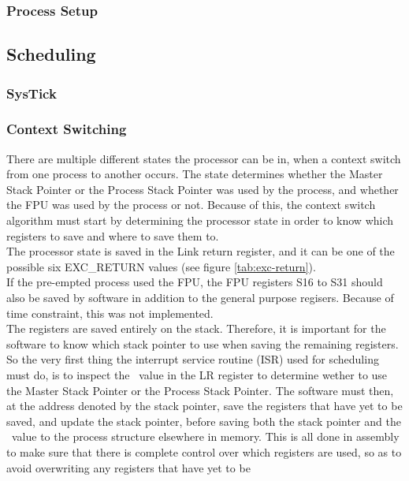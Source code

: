 \subsubsection{Process Setup}

\subsection{Scheduling}

\subsubsection{SysTick}

\subsubsection{Context Switching}
There are multiple different states the processor can be in, when a context 
switch from one process to another occurs. The state determines whether the
Master Stack Pointer or the Process Stack Pointer was used by the process,
and whether the FPU was used by the process or not. Because of this, the context
switch algorithm must start by determining the processor state in order to know
which registers
to save and where to save them to.\\
The processor state is saved in the Link return register, and it can be one of
the possible six EXC\_RETURN values (see figure \ref{tab:exc-return}).\\
If the pre-empted process used the FPU, the FPU registers S16 to S31
should also be saved by software in addition to the general purpose regisers.
Because of time constraint, this was not implemented.\\
The registers are saved entirely on the stack. Therefore, it is important for
the software to know which
stack pointer to use when saving the remaining registers. So the very first
thing the interrupt service routine (ISR) used for scheduling must do, is to inspect
the \excreturn\ value in the LR register to determine wether to use the 
Master Stack Pointer or the Process Stack Pointer. The software must then, at 
the address denoted by the stack pointer, save the registers that have yet to be
saved, and update the stack pointer, before saving both the stack pointer and
the \excreturn\ value to the process structure elsewhere in memory. This is all
done in assembly to make sure that there is complete control over which
registers are used, so as to avoid overwriting any registers that have yet to be
